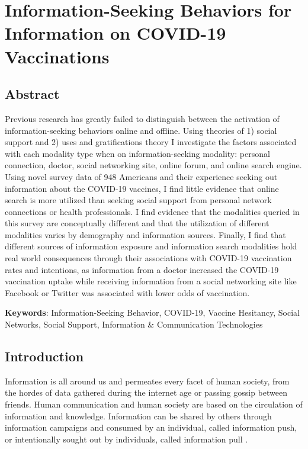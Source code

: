 \hypertarget{paper-2}{%
\chapter{Information-Seeking Behaviors for Information on COVID-19 Vaccinations}\label{paper-2}}

\hypertarget{abstract}{%
\section{Abstract}\label{abstract}}

Previous research has greatly failed to distinguish between the activation of
information-seeking behaviors online and offline. Using theories of 1) social
support and 2) uses and gratifications theory I investigate the factors associated
with each modality type when on information-seeking modality: personal connection,
doctor, social networking site, online forum, and online search engine. Using
novel survey data of 948 Americans and their experience seeking out
information about the COVID-19 vaccines, I find little evidence that online
search is more utilized than seeking social support from personal network
connections or health professionals. I find evidence that the modalities queried
in this survey are conceptually different and that the utilization of different
modalities varies by demography and information sources. Finally, I find that
different sources of information exposure and information search modalities hold real
world consequences through their associations with COVID-19 vaccination rates
and intentions, as information from a doctor increased the COVID-19 vaccination
uptake while receiving information from a social networking site like Facebook
or Twitter was associated with lower odds of vaccination.

\textbf{Keywords}: Information-Seeking Behavior, COVID-19, Vaccine Hesitancy, Social Networks, Social Support, Information \& Communication Technologies

\hypertarget{intro-1}{%
\section{Introduction}\label{intro-1}}

Information is all around us and permeates every facet of human society, from
the hordes of data gathered during the internet age or passing gossip between
friends. Human communication and human society are based on the circulation of
information and knowledge. Information can be shared by others through
information campaigns and consumed by an individual, called information push, or
intentionally sought out by individuals, called information pull
\citep{cybenkoFoundationsInformationPush1999}.

